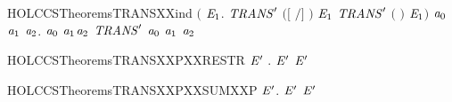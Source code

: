 \begin{SaveVerbatim}{HOLCCSTheoremsTRANSXXind}
       \ensuremath{(}\HOLSymConst{\HOLTokenForall{}}   \ensuremath{\HOLBoundVar{E}\sb{\mathrm{1}}}.
            \ensuremath{\HOLBoundVar{TRANS}\sp{\prime}} \ensuremath{(}\ensuremath{[}  \ensuremath{/}\ensuremath{]} \ensuremath{)}  \ensuremath{\HOLBoundVar{E}\sb{\mathrm{1}}} \HOLSymConst{\HOLTokenImp{}} \ensuremath{\HOLBoundVar{TRANS}\sp{\prime}} \ensuremath{(}  \ensuremath{)}  \ensuremath{\HOLBoundVar{E}\sb{\mathrm{1}}}\ensuremath{)} \HOLSymConst{\HOLTokenImp{}}
       \HOLSymConst{\HOLTokenForall{}}\ensuremath{\HOLBoundVar{a}\sb{\mathrm{0}}} \ensuremath{\HOLBoundVar{a}\sb{\mathrm{1}}} \ensuremath{\HOLBoundVar{a}\sb{\mathrm{2}}}. \ensuremath{\HOLBoundVar{a}\sb{\mathrm{0}}} \HOLTokenTransBegin\ensuremath{\HOLBoundVar{a}\sb{\mathrm{1}}}\HOLTokenTransEnd \ensuremath{\HOLBoundVar{a}\sb{\mathrm{2}}} \HOLSymConst{\HOLTokenImp{}} \ensuremath{\HOLBoundVar{TRANS}\sp{\prime}} \ensuremath{\HOLBoundVar{a}\sb{\mathrm{0}}} \ensuremath{\HOLBoundVar{a}\sb{\mathrm{1}}} \ensuremath{\HOLBoundVar{a}\sb{\mathrm{2}}}
\end{SaveVerbatim}
\newcommand{\HOLCCSTheoremsTRANSXXind}{\UseVerbatim{HOLCCSTheoremsTRANSXXind}}
\begin{SaveVerbatim}{HOLCCSTheoremsTRANSXXPXXRESTR}
\HOLTokenTurnstile{} \HOLSymConst{\HOLTokenForall{}}  \ensuremath{\HOLBoundVar{E}\sp{\prime}} .    \HOLTokenTransBegin{}\HOLTokenTransEnd {}  \ensuremath{\HOLBoundVar{E}\sp{\prime}} \HOLSymConst{\HOLTokenImp{}}  \HOLTokenTransBegin{}\HOLTokenTransEnd \ensuremath{\HOLBoundVar{E}\sp{\prime}}
\end{SaveVerbatim}
\newcommand{\HOLCCSTheoremsTRANSXXPXXRESTR}{\UseVerbatim{HOLCCSTheoremsTRANSXXPXXRESTR}}
\begin{SaveVerbatim}{HOLCCSTheoremsTRANSXXPXXSUMXXP}
\HOLTokenTurnstile{} \HOLSymConst{\HOLTokenForall{}}  \ensuremath{\HOLBoundVar{E}\sp{\prime}}.  \HOLSymConst{\ensuremath{+}}  \HOLTokenTransBegin{}\HOLTokenTransEnd \ensuremath{\HOLBoundVar{E}\sp{\prime}} \HOLSymConst{\HOLTokenImp{}}  \HOLTokenTransBegin{}\HOLTokenTransEnd \ensuremath{\HOLBoundVar{E}\sp{\prime}}
\end{SaveVerbatim}
\newcommand{\HOLCCSTheoremsTRANSXXPXXSUMXXP}{\UseVerbatim{HOLCCSTheoremsTRANSXXPXXSUMXXP}}
